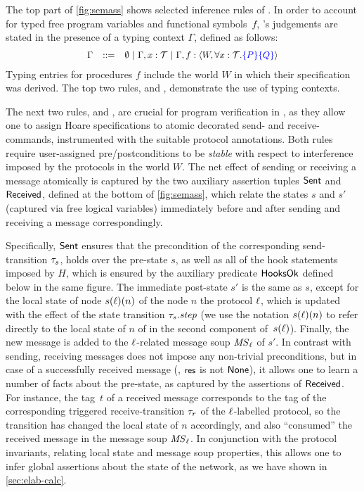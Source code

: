 The top part of \cref{fig:semass} shows selected inference rules
of \disel.
%
In order to account for typed free program variables and functional
symbols~$f$, \disel's judgements are stated in the presence of a
typing context $\Gamma$, defined as follows:
%
\[
{\small{
\begin{array}{rcl}
  \Gamma & ::= & \emptyset ~|~ \Gamma, x: \mathcal{T}~|~ \Gamma, f: \langle{W,
                 \forall x: \mathcal{T}. \ensuremath{\textcolor{blue}{\left\{{P}\right\}}}\ensuremath{\textcolor{blue}{\left\{{Q}\right\}}}}\rangle
\end{array}
}}
\]
%
Typing entries for procedures $f$ include the world $W$ in which their
specification was derived. The top two rules,  and
, demonstrate the use of typing contexts.

The next two rules,  and , are
crucial for program verification in \disel, as they allow one to
assign Hoare specifications to atomic decorated send- and
receive-commands, instrumented with the suitable protocol
annotations. Both rules require user-assigned pre/postconditions to
be \emph{stable} with respect to interference imposed by the protocols
in the world $W$. The net effect of sending or receiving a message
atomically is captured by the two auxiliary assertion tuples
$\mathsf{Sent}$ and $\mathsf{Received}$, defined at the bottom of
\cref{fig:semass}, which relate the states $s$ and $s'$ (captured
via free logical variables) immediately before and after sending and
receiving a message correspondingly.

Specifically, $\mathsf{Sent}$ ensures that the precondition of the
corresponding send-transition $\tau_s$, holds over the pre-state
$s$, as well as all of the hook statements imposed by $H$, which is
ensured by the auxiliary predicate $\mathsf{HooksOk}$ defined below in the
same figure. The immediate post-state $s'$ is the same as $s$, except
for the local state of node $s(\ell)(n)$ of the node $n$ \wrt the
protocol $\ell$, which is updated with the effect of the state
transition $\tau_s.\mathit{step}$ (we use the notation $s(\ell)(n)$ to
refer directly to the local state of $n$ of in the second component
of~$s(\ell)$). Finally, the new message is added to the $\ell$-related
message soup $\mathit{MS}_{\ell}$ of $s'$.
%
In contrast with sending, receiving messages does not impose any
non-trivial preconditions, but in case of a successfully received
message (\ie, $\mathsf{res}$ is not $\mathsf{None}$), it allows one to learn a number
of facts about the pre-state, as captured by the assertions of
$\mathsf{Received}$. For instance, the tag~$t$ of a received message
corresponds to the tag of the corresponding triggered
receive-transition $\tau_r$ of the $\ell$-labelled protocol, so the
transition has changed the local state of $n$ accordingly, and also
``consumed'' the received message in the message soup $\mathit{MS}_{\ell}$. In
conjunction with the protocol invariants, relating local state and
message soup properties, this allows one to infer global assertions
about the state of the network, as we have shown in
\cref{sec:elab-calc}.

